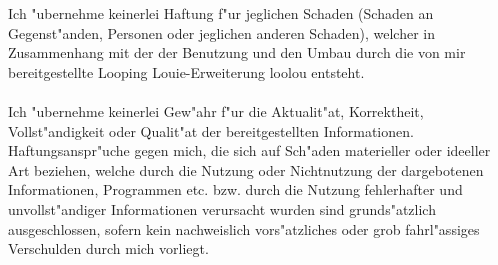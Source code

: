 \label{section:disclaimer}
Ich "ubernehme keinerlei Haftung f"ur jeglichen Schaden (Schaden an Gegenst"anden, Personen oder jeglichen anderen Schaden), welcher in Zusammenhang mit der der Benutzung und den Umbau durch die von mir bereitgestellte Looping Louie-Erweiterung \grqq{}loolou\grqq{} entsteht. \\
\\
Ich "ubernehme keinerlei Gew"ahr f"ur die Aktualit"at, Korrektheit, Vollst"andigkeit oder Qualit"at der bereitgestellten Informationen.
Haftungsanspr"uche gegen mich, die sich auf Sch"aden materieller oder ideeller Art beziehen, welche durch die Nutzung oder Nichtnutzung der dargebotenen Informationen, Programmen etc. bzw. durch die Nutzung fehlerhafter und unvollst"andiger Informationen verursacht wurden sind grunds"atzlich ausgeschlossen, sofern kein nachweislich vors"atzliches oder grob fahrl"assiges Verschulden durch mich vorliegt.
